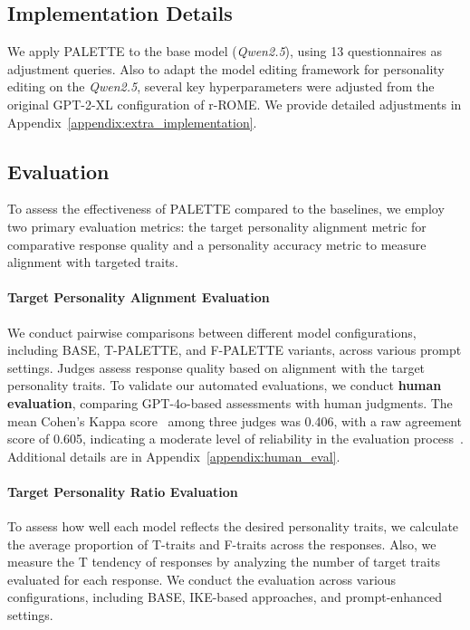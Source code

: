 \subsection{Implementation Details}
We apply PALETTE to the base model (\textit{Qwen2.5}), using 13 questionnaires as adjustment queries.
Also to adapt the model editing framework for personality editing on the \textit{Qwen2.5}, several key hyperparameters were adjusted from the original GPT-2-XL configuration of r-ROME. We provide detailed adjustments in Appendix~\ref{appendix:extra_implementation}.

\subsection{Evaluation}  
To assess the effectiveness of PALETTE compared to the baselines, we employ two primary evaluation metrics: the target personality alignment metric for comparative response quality and a personality accuracy metric to measure alignment with targeted traits. 

\paragraph{Target Personality Alignment Evaluation} We conduct pairwise comparisons between different model configurations, including BASE, T-PALETTE, and F-PALETTE variants, across various prompt settings. Judges assess response quality based on alignment with the target personality traits. To validate our automated evaluations, we conduct \textbf{human evaluation}, comparing GPT-4o-based assessments with human judgments. The mean Cohen’s Kappa score~\cite{cohen1960kappa} among three judges was 0.406, with a raw agreement score of 0.605, indicating a moderate level of reliability in the evaluation process~\cite{landis1977measurement}. Additional details are in Appendix~\ref{appendix:human_eval}. 

\paragraph{Target Personality Ratio Evaluation} To assess how well each model reflects the desired personality traits, we calculate the average proportion of T-traits and F-traits across the responses. Also, we measure the T tendency of responses by analyzing the number of target traits evaluated for each response. We conduct the evaluation across various configurations, including BASE, IKE-based approaches, and prompt-enhanced settings.

